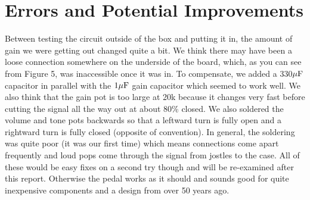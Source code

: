 \documentclass[11pt,twocolumn]{article}
\begin{document}
\section{Errors and Potential Improvements}

Between testing the circuit outside of the box and putting it in, the amount of gain we were getting out changed quite a bit. We think there may have been a loose connection somewhere on the underside of the board, which, as you can see from Figure 5, was inaccessible once it was in. To compensate, we added a 330$\rm \mu F$ capacitor in parallel with the $\rm 1\mu F$ gain capacitor which seemed to work well. We also think that the gain pot is too large at 20k because it changes very fast before cutting the signal all the way out at about 80\% closed. We also soldered the volume and tone pots backwards so that a leftward turn is fully open and a rightward turn is fully closed (opposite of convention). In general, the soldering was quite poor (it was our first time) which means connections come apart frequently and loud pops come through the signal from jostles to the case. All of these would be easy fixes on a second try though and will be re-examined after this report. Otherwise the pedal works as it should and sounds good for quite inexpensive components and a design from over 50 years ago.
\end{document}
